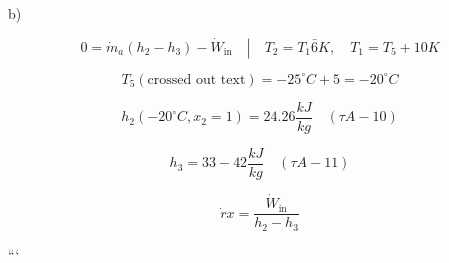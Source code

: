 b)

\[
0 = \dot{m}_a (h_2 - h_3) - \dot{W}_{\text{in}} \quad \left| \quad T_2 = T_1 \bar{6} K, \quad T_1 = T_5 + 10 K \right.
\]

\[
T_5 \left( \text{crossed out text} \right) = -25^\circ C + 5 = -20^\circ C
\]

\[
h_2 (-20^\circ C, x_2 = 1) = 24.26 \frac{kJ}{kg} \quad (\tau A - 10)
\]

\[
h_3 = 33 - 42 \frac{kJ}{kg} \quad (\tau A - 11)
\]

\[
\dot{r} x = \frac{\dot{W}_{\text{in}}}{h_2 - h_3}
\]

```